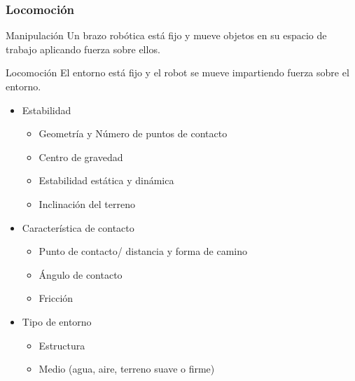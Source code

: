 \begin{frame}
    \frametitle{Locomoción}

	\begin{block}{Manipulación}
    	Un brazo robótica está fijo y mueve objetos en su espacio de trabajo aplicando fuerza sobre ellos.
	\end{block}
   
    \begin{block}{Locomoción}
		El entorno está fijo y el robot se mueve impartiendo fuerza sobre el entorno.
	\end{block}

    \begin{itemize}
        \item Estabilidad
        \begin{itemize}
            \item Geometría y Número de puntos de contacto
            \item Centro de gravedad
            \item Estabilidad estática y dinámica
            \item Inclinación del terreno
        \end{itemize}
        \item Característica de contacto
        \begin{itemize}
            \item Punto de contacto/ distancia y forma de camino
            \item Ángulo de contacto
            \item Fricción
        \end{itemize}
        \item Tipo de entorno
        \begin{itemize}
            \item Estructura
            \item Medio (agua, aire, terreno suave o firme)
        \end{itemize}
    \end{itemize}
\end{frame}

